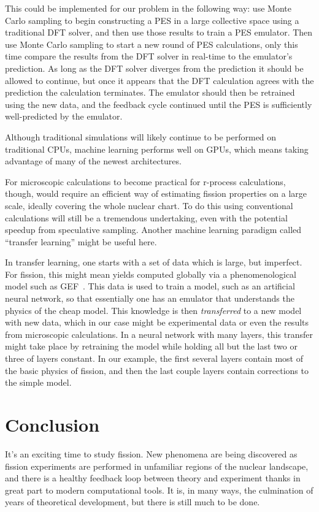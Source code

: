This could be implemented for our problem in the following way: use Monte Carlo sampling to begin constructing a PES in a large collective space using a traditional DFT solver, and then use those results to train a PES emulator. Then use Monte Carlo sampling to start a new round of PES calculations, only this time compare the results from the DFT solver in real-time to the emulator's prediction. As long as the DFT solver diverges from the prediction it should be allowed to continue, but once it appears that the DFT calculation agrees with the prediction the calculation terminates. The emulator should then be retrained using the new data, and the feedback cycle continued until the PES is sufficiently well-predicted by the emulator.

Although traditional simulations will likely continue to be performed on traditional CPUs, machine learning performs well on GPUs, which means taking advantage of many of the newest architectures.

For microscopic calculations to become practical for r-process calculations, though, would require an efficient way of estimating fission properties on a large scale, ideally covering the whole nuclear chart. To do this using conventional calculations will still be a tremendous undertaking, even with the potential speedup from speculative sampling. Another machine learning paradigm called ``transfer learning'' might be useful here.

In transfer learning, one starts with a set of data which is large, but imperfect. For fission, this might mean yields computed globally via a phenomenological model such as GEF~\cite{Schmidt2016}. This data is used to train a model, such as an artificial neural network, so that essentially one has an emulator that understands the physics of the cheap model. This knowledge is then \textit{transferred} to a new model with new data, which in our case might be experimental data or even the results from microscopic calculations. In a neural network with many layers, this transfer might take place by retraining the model while holding all but the last two or three of layers constant. In our example, the first several layers contain most of the basic physics of fission, and then the last couple layers contain corrections to the simple model.


\section{Conclusion}
It's an exciting time to study fission. New phenomena are being discovered as fission experiments are performed in unfamiliar regions of the nuclear landscape, and there is a healthy feedback loop between theory and experiment thanks in great part to modern computational tools. It is, in many ways, the culmination of years of theoretical development, but there is still much to be done.